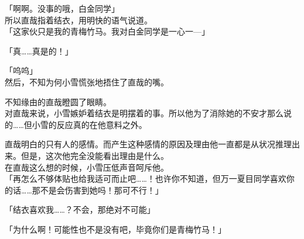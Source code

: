 「啊啊。没事的哦，白金同学」\\

所以直哉指着结衣，用明快的语气说道。\\

「这家伙只是我的青梅竹马。我对白金同学是一心一—」

「真……真是的！」

「呜呜」\\

然后，不知为何小雪慌张地捂住了直哉的嘴。

不知缘由的直哉瞪圆了眼睛。\\

对直哉来说，小雪嫉妒着结衣是明摆着的事。所以他为了消除她的不安才那么说的……但小雪的反应真的在他意料之外。

直哉明白的只有人的感情。而产生这种感情的原因及理由他一直都是从状况推理出来。但是，这次他完全没能看出理由是什么。\\

在直哉这么想的时候，小雪压低声音呵斥他。\\

「再怎么不够体贴也给我适可而止吧……！也许你不知道，但万一夏目同学喜欢你的话……那不是会伤害到她吗！那可不行！」

「结衣喜欢我……？不会，那绝对不可能」

「为什么啊！可能性也不是没有吧，毕竟你们是青梅竹马！」\\

